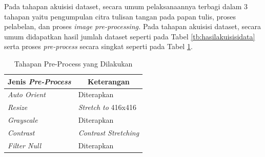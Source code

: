 Pada tahapan akuisisi dataset, secara umum pelaksanaannya terbagi dalam 3 tahapan yaitu pengumpulan citra tulisan tangan pada papan tulis, proses pelabelan, dan proses \textit{image pre-processing.} Pada tahapan akuisisi dataset, secara umum didapatkan hasil jumlah dataset seperti pada Tabel \ref*{tb:hasilakuisisidata} serta proses \textit{pre-process} secara singkat seperti pada Tabel \ref*{tb:checklistpreprocess}.

\begin{center}
  \begin{longtable}[c]{|l|l|}
    \caption{Tahapan Pre-Process yang Dilakukan}
    \label{tb:checklistpreprocess}\\
    \hline
    \multicolumn{1}{|c|}{\textbf{Jenis \textit{Pre-Process}}} & \multicolumn{1}{c|}{\textbf{Keterangan}} \\ \hline
    \endhead
    \textit{Auto Orient}                             & Diterapkan                                               \\ \hline
    \textit{Resize}                                  & \textit{Stretch to} 416x416                              \\ \hline
    \textit{Grayscale}                               & Diterapkan                                               \\ \hline
    \textit{Contrast}                                & \textit{Contrast Stretching}                             \\ \hline
    \textit{Filter Null}                             & Diterapkan                                               \\ \hline
  \end{longtable}
\end{center}

